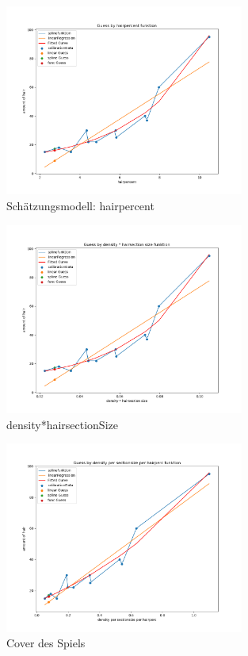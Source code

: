 \documentclass[german,a4paper, 12pt]{scrartcl}
\begin{document}
\begin{figure}[H]
	\centering
	\includegraphics[width=0.7\textwidth]{fig64/g01_hairpercent.png}
	\caption[]{Schätzungsmodell: hairpercent}
	\label{img:cover}
\end{figure}
\begin{figure}[H]
	\centering
	\includegraphics[width=0.7\textwidth]{fig64/g02_densitynorm.png}
	\caption[]{density*hairsectionSize}
	\label{img:cover}
\end{figure}
\begin{figure}[H]
	\centering
	\includegraphics[width=0.7\textwidth]{fig64/g03_densitynorm2.png}
	\caption[]{Cover des Spiels}
	\label{img:cover}
\end{figure}
\end{document}
